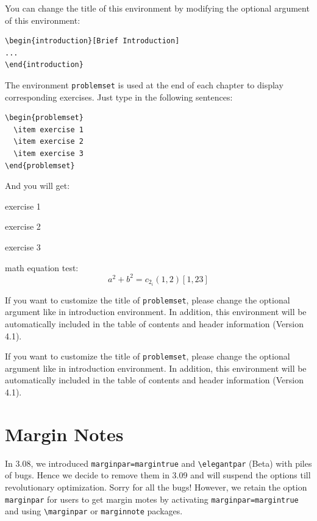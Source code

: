 \documentclass[11pt]{elegantbook}
\begin{document}
You can change the title of this environment by modifying the optional argument of this environment:
\begin{lstlisting}
\begin{introduction}[Brief Introduction]
...
\end{introduction}
\end{lstlisting}

The environment \lstinline{problemset} is used at the end of each chapter to display corresponding exercises. Just type in the following sentences:
\begin{lstlisting}
\begin{problemset}
  \item exercise 1
  \item exercise 2
  \item exercise 3
\end{problemset}
\end{lstlisting}
And you will get:
\begin{problemset}
  \item exercise 1
  \item exercise 2
  \item exercise 3
  \item math equation test:
  \begin{equation}
  a^2+b^2=c_{2_{i}} (1,2) [1,23]
  \end{equation}
\end{problemset}
\begin{remark}
If you want to customize the title of \lstinline{problemset}, please change the optional argument like in introduction environment. In addition, this environment will be automatically included in the table of contents and header information (Version 4.1).
\end{remark}

\begin{solution}
  If you want to customize the title of \lstinline{problemset}, please change the optional argument like in introduction environment. In addition, this environment will be automatically included in the table of contents and header information (Version 4.1).
\end{solution}

\section{Margin Notes}
In 3.08, we introduced \lstinline{marginpar=margintrue} and \lstinline{\elegantpar} (Beta) with piles of bugs. Hence we decide to remove them in 3.09 and will suspend the options till revolutionary optimization. Sorry for all the bugs! However, we retain the option \lstinline{marginpar} for users to get margin motes by activating \lstinline{marginpar=margintrue} and using \lstinline{\marginpar} or \lstinline{marginnote} packages.
\end{document}
